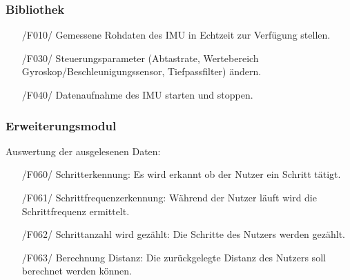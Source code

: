 \documentclass[a4paper,12pt]{article}
\begin{document}
    \subsubsection{Bibliothek}
    \begin{itemize}
      \item[/F010/] Gemessene Rohdaten des \Gls{IMU} in \Gls{Echtzeit} zur Verfügung stellen.
      \item[/F030/] Steuerungsparameter (Abtastrate, Wertebereich Gyroskop/Beschleunigungssensor, Tiefpassfilter) ändern. %
      \item[/F040/] Datenaufnahme des \Gls{IMU} starten und stoppen.
    \end{itemize}
    \subsubsection{Erweiterungsmodul}
     Auswertung der ausgelesenen Daten:
     \begin{itemize}
      \item[/F060/] \textsf{Schritterkennung:} Es wird erkannt ob der Nutzer ein Schritt tätigt.
      \item[/F061/] \textsf{Schrittfrequenzerkennung:} Während der Nutzer läuft wird die Schrittfrequenz ermittelt.
      \item[/F062/] \textsf{Schrittanzahl wird gezählt:} Die Schritte des Nutzers werden gezählt.
      \item[/F063/] \textsf{Berechnung Distanz:} Die zurückgelegte Distanz des Nutzers soll berechnet werden können.
    \end{itemize}
\end{document}
